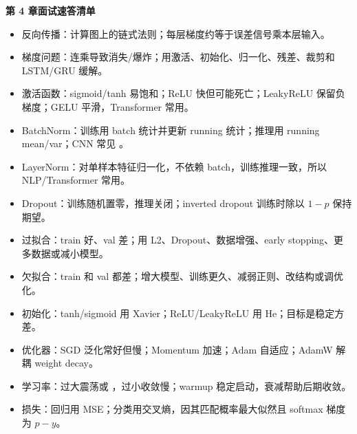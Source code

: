 \begin{quickcard}
\textbf{第 4 章面试速答清单}
\begin{itemize}
  \item 反向传播：计算图上的链式法则；每层梯度约等于误差信号乘本层输入。
  \item 梯度问题：连乘导致消失/爆炸；用激活、初始化、归一化、残差、裁剪和 LSTM/GRU 缓解。
  \item 激活函数：sigmoid/tanh 易饱和；ReLU 快但可能死亡；LeakyReLU 保留负梯度；GELU 平滑，Transformer 常用。
  \item BatchNorm：训练用 batch 统计并更新 running 统计；推理用 running mean/var；CNN 常见 。
  \item LayerNorm：对单样本特征归一化，不依赖 batch，训练推理一致，所以 NLP/Transformer 常用。
  \item Dropout：训练随机置零，推理关闭；inverted dropout 训练时除以 $1-p$ 保持期望。
  \item 过拟合：train 好、val 差；用 L2、Dropout、数据增强、early stopping、更多数据或减小模型。
  \item 欠拟合：train 和 val 都差；增大模型、训练更久、减弱正则、改结构或调优化。
  \item 初始化：tanh/sigmoid 用 Xavier；ReLU/LeakyReLU 用 He；目标是稳定方差。
  \item 优化器：SGD 泛化常好但慢；Momentum 加速；Adam 自适应；AdamW 解耦 weight decay。
  \item 学习率：过大震荡或 ，过小收敛慢；warmup 稳定启动，衰减帮助后期收敛。
  \item 损失：回归用 MSE；分类用交叉熵，因其匹配概率最大似然且 softmax 梯度为 $p-y$。
\end{itemize}
\end{quickcard}

